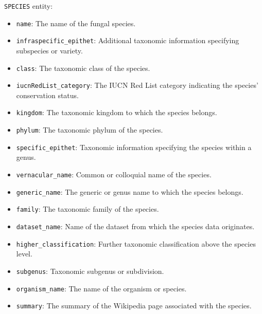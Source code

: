 \texttt{SPECIES} entity:
\begin{itemize}
    \item \texttt{name}: The name of the fungal species.
    \item \texttt{infraspecific\_epithet}: Additional taxonomic information specifying subspecies or variety.
    \item \texttt{class}: The taxonomic class of the species.
    \item \texttt{iucnRedList\_category}: The IUCN Red List category indicating the species' conservation status.
    \item \texttt{kingdom}: The taxonomic kingdom to which the species belongs.
    \item \texttt{phylum}: The taxonomic phylum of the species.
    \item \texttt{specific\_epithet}: Taxonomic information specifying the species within a genus.
    \item \texttt{vernacular\_name}: Common or colloquial name of the species.
    \item \texttt{generic\_name}: The generic or genus name to which the species belongs.
    \item \texttt{family}: The taxonomic family of the species.
    \item \texttt{dataset\_name}: Name of the dataset from which the species data originates.
    \item \texttt{higher\_classification}: Further taxonomic classification above the species level.
    \item \texttt{subgenus}: Taxonomic subgenus or subdivision.
    \item \texttt{organism\_name}: The name of the organism or species.
    \item \texttt{summary}: The summary of the Wikipedia page associated with the species.
\end{itemize}

